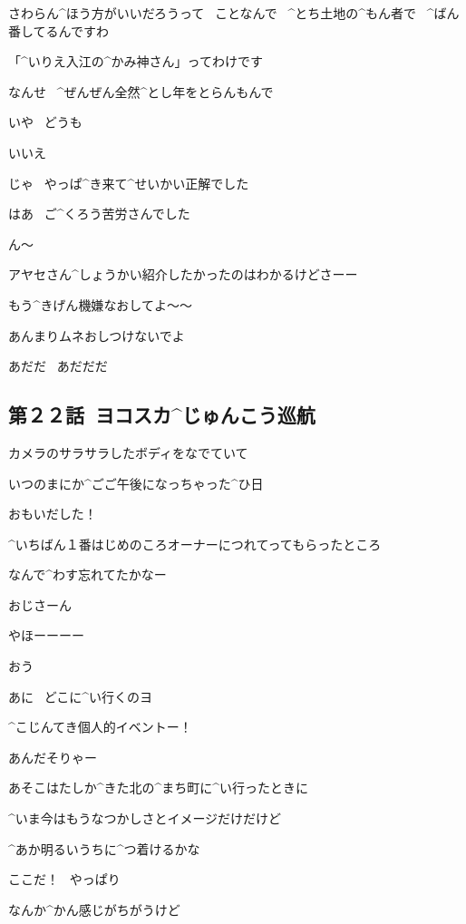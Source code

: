 \Person さわらん^{ほう}{方}がいいだろうって
\ ことなんで
\ ^{とち}{土地}の^{もん}{者}で
\ ^{ばん}{番}してるんですわ

\Person 「^{いりえ}{入江}の^{かみ}{神}さん」ってわけです

\page
\Person なんせ
\ ^{ぜんぜん}{全然}^{とし}{年}をとらんもんで

\page
\Ayase いや
\ どうも

\Person いいえ

\Ayase じゃ
\ やっぱ^{き}{来}て^{せいかい}{正解}でした

\Person はあ
\ ご^{くろう}{苦労}さんでした

\Ayase ん〜

\page
\Alpha アヤセさん^{しょうかい}{紹介}したかったのはわかるけどさーー

\Alpha もう^{きげん}{機嫌}なおしてよ〜〜

\Takahiro あんまりムネおしつけないでよ

\Takahiro あだだ
\ あだだだ


\subsection{第２２話\ ヨコスカ^{じゅんこう}{巡航}}

\page[102]
\Alpha カメラのサラサラしたボディをなでていて

\Alpha いつのまにか^{ごご}{午後}になっちゃった^{ひ}{日}

\page[104]
\Alpha おもいだした！

\Alpha ^{いちばん}{１番}はじめのころオーナーにつれてってもらったところ

\Alpha なんで^{わす}{忘}れてたかなー

\Alpha おじさーん

\page
\Alpha やほーーーー

\Ojisan おう

\Ojisan あに
\ どこに^{い}{行}くのヨ

\Alpha ^{こじんてき}{個人的}イベントー！

\Ojisan あんだそりゃー

\page
\Alpha あそこはたしか^{きた}{北}の^{まち}{町}に^{い}{行}ったときに

\Alpha ^{いま}{今}はもうなつかしさとイメージだけだけど

\Alpha ^{あか}{明}るいうちに^{つ}{着}けるかな

\page
\Alpha ここだ！
\ やっぱり

\Alpha なんか^{かん}{感}じがちがうけど

